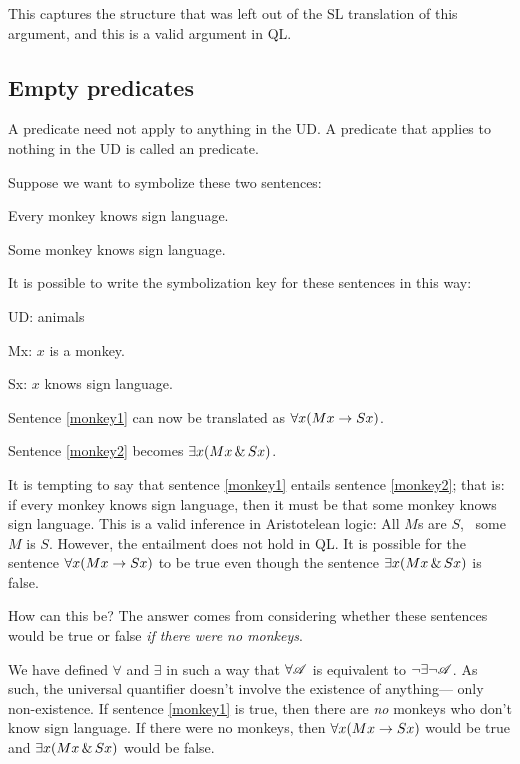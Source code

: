 This captures the structure that was left out of the SL translation of this argument, and this is a valid argument in QL.









\subsection{Empty predicates}
A predicate need not apply to anything in the UD. A predicate that applies to nothing in the UD is called an  predicate.

Suppose we want to symbolize these two sentences:
\begin{earg}
\item[\ex{monkey1}]Every monkey knows sign language.
\item[\ex{monkey2}]Some monkey knows sign language.
\end{earg}
It is possible to write the symbolization key for these sentences in this way:
\begin{ekey}
\item[UD:] animals
\item[Mx:] $x$ is a monkey.
\item[Sx:] $x$ knows sign language.
\end{ekey}

Sentence \ref{monkey1} can now be translated as $\forall x(Mx \rightarrow Sx)$.

Sentence \ref{monkey2} becomes $\exists x(Mx \,\&\, Sx)$.

It is tempting to say that sentence \ref{monkey1} entails sentence \ref{monkey2}; that is: if every monkey knows sign language, then it must be that some monkey knows sign language. This is a valid inference in Aristotelean logic: All $M$s are $S$, \therefore\ some $M$ is $S$. However, the entailment does not hold in QL. It is possible for the sentence $\forall x(Mx \rightarrow Sx)$ to be true even though the sentence $\exists x(Mx \,\&\, Sx)$ is false.

How can this be? The answer comes from considering whether these sentences would be true or false \emph{if there were no monkeys}.

We have defined $\forall$ and $\exists$ in such a way that $\forall\mathscr{A}$ is equivalent to $\neg \exists\neg \mathscr{A}$. As such, the universal quantifier doesn't involve the existence of anything--- only non-existence. If sentence \ref{monkey1} is true, then there are \emph{no} monkeys who don't know sign language. If there were no monkeys, then $\forall x(Mx \rightarrow Sx)$ would be true and $\exists x(Mx \,\&\, Sx)$ would be false.

